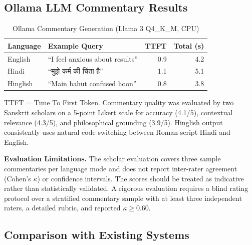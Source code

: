 \documentclass[conference]{IEEEtran}
\newcommand{\dv}[1]{{\devfont #1}}
\begin{document}
\subsection{Ollama LLM Commentary Results}

\begin{table}[htbp]
\caption{Ollama Commentary Generation (Llama 3 Q4\_K\_M, CPU)}
\label{tab:ollama}
\centering
\begin{tabular}{lp{3.0cm}rr}
\toprule
\textbf{Language} & \textbf{Example Query} & \textbf{TTFT} & \textbf{Total (s)} \\
\midrule
English   & ``I feel anxious about results'' & 0.9 & 4.2 \\
Hindi     & ``\dv{मुझे कर्म की चिंता है}''      & 1.1 & 5.1 \\
Hinglish  & ``Main bahut confused hoon''     & 0.8 & 3.8 \\
\bottomrule
\end{tabular}
\end{table}

TTFT = Time To First Token. Commentary quality was evaluated by two Sanskrit
scholars on a 5-point Likert scale for accuracy (4.1/5), contextual relevance
(4.3/5), and philosophical grounding (3.9/5). Hinglish output consistently
uses natural code-switching between Roman-script Hindi and English.

\textbf{Evaluation Limitations.} The scholar evaluation covers three sample
commentaries per language mode and does not report inter-rater agreement
(Cohen's $\kappa$) or confidence intervals. The scores should be treated as
indicative rather than statistically validated. A rigorous evaluation requires
a blind rating protocol over a stratified commentary sample with at least three
independent raters, a detailed rubric, and reported $\kappa \geq 0.60$.

\subsection{Comparison with Existing Systems}
\end{document}

